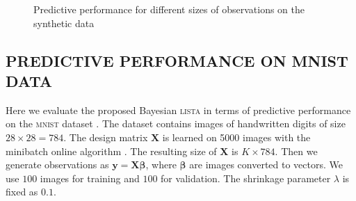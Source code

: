 \documentclass[letterpaper]{article}
\begin{document}
\begin{figure}[t]
\centering
\caption{Predictive performance for different sizes of observations on the synthetic data}
\label{fig:unsersampling_synthetic}
\end{figure}



\subsection{\uppercase{Predictive performance on mnist data}}
Here we evaluate the proposed Bayesian \textsc{lista} in terms of predictive performance on the \textsc{mnist} dataset \citep{lecun1998gradient}. The dataset contains images of handwritten digits of size $28 \times 28 = 784$. The design matrix $\mathbf{X}$ is learned on 5000 images with the minibatch online algorithm \citep{mairal2009online}. The resulting size of $\mathbf{X}$ is $K \times 784$. Then we generate observations as $\mathbf{y} = \mathbf{X}\boldsymbol\beta$, where $\boldsymbol\beta$ are images converted to vectors. We use $100$ images for training and $100$ for validation. The shrinkage parameter $\lambda$ is fixed as $0.1$.
\end{document}
